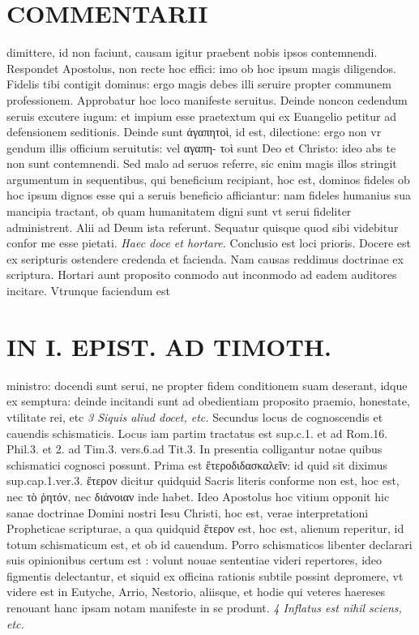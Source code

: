 \documentclass{article}
\begin{document}
\begin{pages}
\section*{COMMENTARII }
\marginpar{[ p.148 ]}\pstart dimittere, id non faciunt, causam igitur praebent nobis ipsos contemnendi. Respondet Apostolus, non recte hoc effici: imo ob hoc ipsum magis diligendos. Fidelis tibi contigit dominus: ergo magis debes illi seruire propter communem professionem. Approbatur hoc loco manifeste seruitus. Deinde noncon cedendum seruis excutere iugum: et impium esse praetextum qui ex Euangelio petitur ad defensionem seditionis. Deinde sunt ἀγαπητοὶ, id est, dilectione: ergo non vr gendum illis officium seruitutis: vel αγαπη- τoὶ sunt Deo et Christo: ideo abs te non sunt contemnendi. Sed malo ad seruos referre, sic enim magis illos stringit argumentum in sequentibus, qui beneficium recipiant, hoc est, dominos fideles ob hoc ipsum dignos esse qui a seruis beneficio afficiantur: nam fideles humanius sua mancipia tractant, ob quam humanitatem digni sunt vt serui fideliter administrent. Alii ad Deum ista referunt. Sequatur quisque quod sibi videbitur confor me esse pietati.  \pend
\textit{Haec doce et hortare. }\pstart Conclusio est loci prioris. Docere est ex seripturis ostendere credenda et facienda. Nam causas reddimus doctrinae ex scriptura. Hortari aunt proposito conmodo aut inconmodo ad eadem auditores incitare. Vtrunque faciendum est  \pend
\section*{IN I. EPIST. AD TIMOTH. }
\marginpar{[ p.149 ]}\pstart ministro: docendi sunt serui, ne propter fidem conditionem suam deserant, idque ex semptura: deinde incitandi sunt ad obedientiam proposito praemio, honestate, vtilitate rei, etc  \pend
\textit{3 Siquis aliud docet, etc. }\pstart Secundus locus de cognoscendis et cauendis schismaticis. Locus iam partim tractatus est sup.c.1. et ad Rom.16. Phil.3. et 2. ad Tim.3. vers.6.ad Tit.3. In presentia colligantur notae quibus schismatici cognosci possunt.  \pend\pstart Prima est ἔτεροδιδασκαλεῖν: id quid sit diximus sup.cap.1.ver.3. ἕτερον dicitur quidquid Sacris literis conforme non est, hoc est, nec τὸ ῥητόν, nec διάνοιαν inde habet. Ideo Apostolus hoc vitium opponit hic sanae doctrinae Domini nostri Iesu Christi, hoc est, verae interpretationi Propheticae scripturae, a qua quidquid ἕτερον est, hoc est, alienum reperitur, id totum schismaticum est, et ob id cauendum. Porro schismaticos libenter declarari suis opinionibus certum est : volunt nouae sententiae videri repertores, ideo figmentis delectantur, et siquid ex officina rationis subtile possint depromere, vt videre est in Eutyche, Arrio, Nestorio, aliisque, et hodie qui veteres haereses renouant hanc ipsam notam manifeste in se produnt.  \pend
\textit{4 Inflatus est nihil sciens, etc. }

\end{pages}
\end{document}
